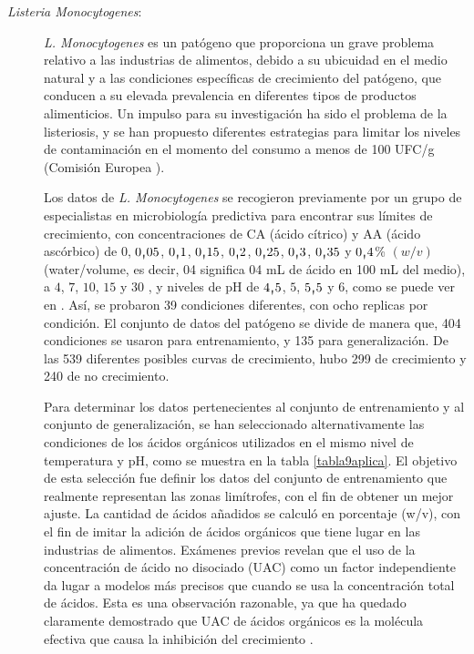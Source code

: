 \begin{description}
	\item[\textit{Listeria Monocytogenes}:] \textit{L. Monocytogenes} es un patógeno que proporciona
un grave problema relativo a las industrias de alimentos, debido a su ubicuidad en el
medio
natural
\cite{Hwang2005} y a las condiciones específicas de crecimiento del patógeno, que conducen
a su elevada prevalencia en diferentes tipos de productos alimenticios. Un impulso para
su investigación ha sido el problema de la listeriosis, y se han
propuesto diferentes estrategias para limitar los niveles de contaminación en el momento
del consumo a menos de 100 UFC/g (Comisión Europea \cite{Commission1999}).

Los datos de \textit{L. Monocytogenes} se recogieron previamente por un grupo de especialistas en
microbiología predictiva para encontrar sus límites de crecimiento, con concentraciones de CA (ácido
cítrico) y AA (ácido ascórbico) de $0$, $0\text{\textquotestraightbase}05$,
$0\text{\textquotestraightbase}1$, $0\text{\textquotestraightbase}15$,
$0\text{\textquotestraightbase}2$,
$0\text{\textquotestraightbase}25$, $0\text{\textquotestraightbase}3$,
$0\text{\textquotestraightbase}35$ y $0\text{\textquotestraightbase}4$\%
$(w/v)$ (water/volume, es decir, 0\text{\textquotestraightbase}4 significa
0\text{\textquotestraightbase}4
mL de ácido en 100 mL del medio), a $4$, $7$, $10$, $15$ y $30$ \textcelsius,
y niveles de pH de $4\text{\textquotestraightbase}5$, $5$, $5\text{\textquotestraightbase}5$ y $6$,
como se puede
ver en \cite{Valero2007b}. Así,  se probaron 39 condiciones diferentes, con ocho replicas por
condición. El conjunto de datos del patógeno se divide de manera que, 404  condiciones
se usaron para
entrenamiento, y 135 para generalización. De las 539 diferentes posibles curvas de
crecimiento, hubo 299 de crecimiento y 240 de no crecimiento.

Para determinar los datos pertenecientes al conjunto de entrenamiento y al conjunto de
generalización, se han seleccionado alternativamente las condiciones de los ácidos orgánicos
utilizados en el mismo nivel de temperatura y pH, como se muestra en la tabla \ref{tabla9aplica}. El
objetivo de esta selección fue definir los datos del conjunto de entrenamiento que realmente
representan
las zonas limítrofes, con el fin de obtener un mejor ajuste. La cantidad de ácidos añadidos
se calculó en porcentaje (w/v), con el fin de imitar la adición de ácidos orgánicos que tiene lugar
en las industrias de alimentos. Exámenes previos revelan que el uso de la concentración de ácido no
disociado (UAC) como un factor independiente da lugar a modelos más precisos que cuando se usa
la concentración total de ácidos. Esta es una observación razonable, ya que ha quedado
claramente demostrado que UAC de ácidos orgánicos es la molécula efectiva que causa la inhibición
del crecimiento \cite{ICMSF1980}.


\end{description}
